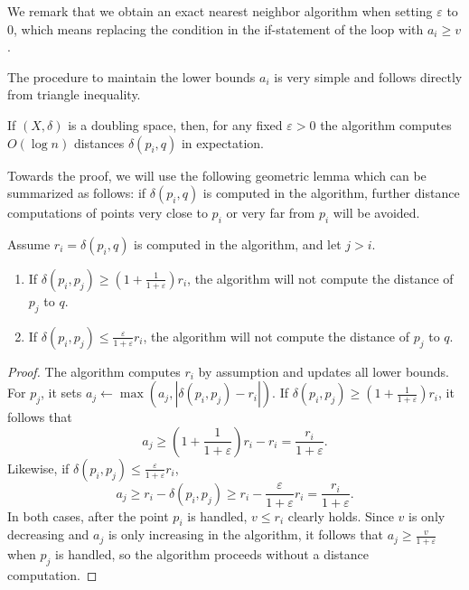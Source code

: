 \documentclass[a4paper,USenglish]{socg-lipics-v2018}
\newcommand{\eps}{\varepsilon}
\newcommand{\dist}{\delta}
\begin{document}
We remark that we obtain an exact nearest neighbor algorithm
when setting $\eps$ to $0$, which means 
replacing the condition in the if-statement of the loop
with $a_i\geq v$.

The procedure to maintain the lower bounds $a_i$
is very simple and follows directly
from triangle inequality.

\begin{algorithmic}
        \State {$a_k \gets \max(a_k, |\dist(p_i, p_k) - r_i|)$}
    \EndFor
\EndProcedure
\end{algorithmic}

\begin{theorem}
\label{thm:ann_bound}
    If $(X, \dist)$ is a doubling space, then, for any fixed $\eps > 0$ the
    algorithm computes $O(\log n)$ distances $\dist(p_i, q)$ in expectation.
\end{theorem}

Towards the proof, we will use the following geometric lemma which
can be summarized as follows: if $\dist(p_i,q)$ is computed in the algorithm,
further distance computations of points very close to $p_i$ or very far from $p_i$
will be avoided.

\begin{lemma}
\label{lem:bound_lemma}
Assume $r_i=\dist(p_i,q)$ is computed in the algorithm, and let $j>i$.
\begin{enumerate}
\item If $\dist(p_i,p_j)\geq (1+\frac{1}{1+\eps}) r_i$, the algorithm will not compute the distance
of $p_j$ to $q$.
\item If $\dist(p_i,p_j)\leq\frac{\eps}{1+\eps}r_i$, the algorithm will not compute
the distance of $p_j$ to $q$.
\end{enumerate}
\end{lemma}
\begin{proof}
The algorithm computes $r_i$ by assumption and updates
all lower bounds. For $p_j$, it sets $a_j\gets \max (a_j,|\dist(p_i,p_j)-r_i|)$.
If $\dist(p_i,p_j)\geq (1+\frac{1}{1+\eps})r_i$, it follows that 
\[a_j\geq (1+\frac{1}{1+\eps})r_i - r_i = \frac{r_i}{1+\eps}.\]
Likewise, if $\dist(p_i,p_j)\leq\frac{\eps}{1+\eps}r_i$,
\[a_j\geq r_i-\dist(p_i,p_j) \geq r_i - \frac{\eps}{1+\eps}r_i = \frac{r_i}{1+\eps}.\]
In both cases, after the point $p_i$ is handled,
$v\leq r_i$ clearly holds. Since $v$ is only decreasing
and $a_j$ is only increasing in the algorithm,
it follows that $a_j\geq \frac{v}{1+\eps}$ when $p_j$ is handled,
so the algorithm proceeds without a distance computation.
\end{proof}
\end{document}
